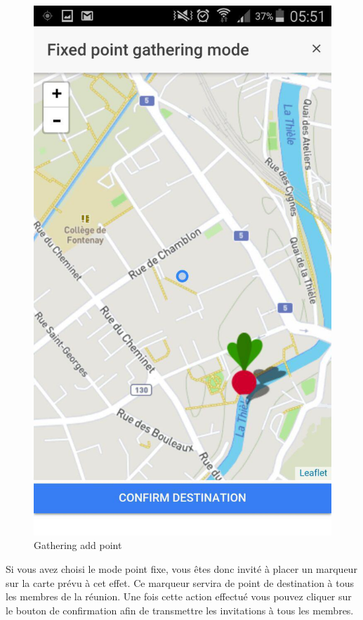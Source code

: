 \documentclass[french]{article}
\begin{document}
	\begin{figure}[H]
		\centering
		\includegraphics{../screenshot/screenshot-gathering-add-point}
		\caption{Gathering add point}
		\label{Gathering add point}
	\end{figure} 
	Si vous avez choisi le mode point fixe, vous êtes donc invité à placer un marqueur sur la carte prévu à cet effet. Ce marqueur servira de point de destination à tous les membres de la réunion. Une fois cette action effectué vous pouvez cliquer sur le bouton de confirmation afin de transmettre les invitations à tous les membres.
\end{document}
